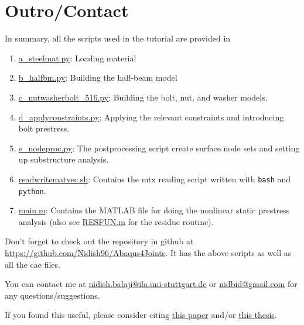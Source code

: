 \documentclass[11pt]{article}
\begin{document}
\section{Outro/Contact}
\label{sec:orgbd0e4af}
In summary, all the scripts used in the tutorial are provided in 
\begin{enumerate}
\item \href{https://github.com/Nidish96/Abaqus4Joints/blob/main/scripts/a\_steelmat.py}{a\_steelmat.py}: Loading material
\item \href{https://github.com/Nidish96/Abaqus4Joints/blob/main/scripts/b\_halfbm.py}{b\_halfbm.py}: Building the half-beam model
\item \href{https://github.com/Nidish96/Abaqus4Joints/blob/main/scripts/c\_nutwasherbolt\_516.py}{c\_nutwasherbolt\_516.py}: Building the bolt, nut, and washer models.
\item \href{https://github.com/Nidish96/Abaqus4Joints/blob/main/scripts/d\_applyconstraints.py}{d\_applyconstraints.py}: Applying the relevant constraints and introducing bolt prestress.
\item \href{https://github.com/Nidish96/Abaqus4Joints/blob/main/scripts/e\_nodeproc.py}{e\_nodeproc.py}: The postprocessing script create surface node sets and setting up substructure analysis.
\item \href{https://github.com/Nidish96/Abaqus4Joints/blob/main/scripts/readwritematvec.sh}{readwritematvec.sh}: Contains the mtx reading script written with \texttt{bash} and \texttt{python}.
\item \href{https://github.com/Nidish96/Abaqus4Joints/blob/main/assets/demo/main.m}{main.m}: Contains the MATLAB file for doing the nonlinear static prestress analysis (also see \href{https://github.com/Nidish96/Abaqus4Joints/blob/main/assets/demo/RESFUN.m}{RESFUN.m} for the residue routine).
\end{enumerate}

Don't forget to check out the repository in github at \href{https://github.com/Nidish96/Abaqus4Joints}{https://github.com/Nidish96/Abaqus4Joints}.
It has the above scripts as well as all the cae files.

You can contact me at \href{mailto:nidish.balaji@ila.uni-stuttgart.de}{nidish.balaji@ila.uni-stuttgart.de} or \href{mailto:nidbid@gmail.com}{nidbid@gmail.com} for any questions/suggestions.

If you found this useful, please consider citing \href{https://www.sciencedirect.com/science/article/abs/pii/S0888327020300017}{this paper} and/or \href{https://scholarship.rice.edu/handle/1911/113700}{this thesis}.
\end{document}
